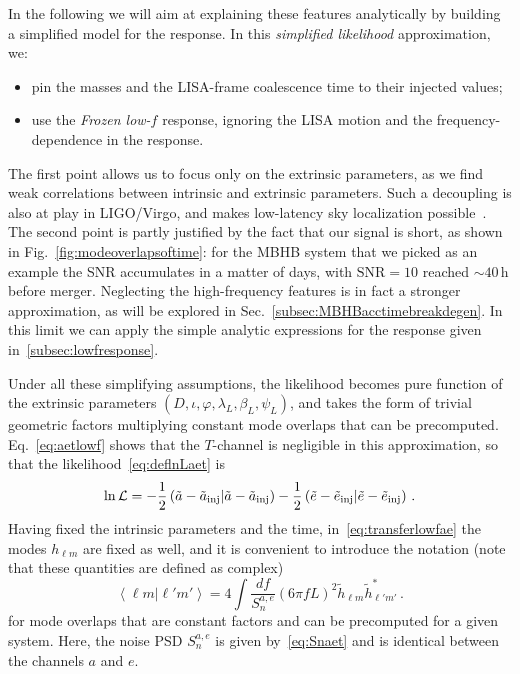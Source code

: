 \documentclass[aps,showpacs,twocolumn,prd,superscriptaddress,nofootinbib]{revtex4-1}
\newcommand{\be}{\begin{equation}}
\newcommand{\ee}{\end{equation}}
\newcommand\calL{{\mathcal{L}}}
\newcommand\betaL{{\beta_{L}}}
\newcommand\lambdaL{{\lambda_{L}}}
\newcommand\psiL{{\psi_{L}}}
\begin{document}
In the following we will aim at explaining these features analytically by building a simplified model for the response. In this \textit{simplified likelihood} approximation, we:
\begin{itemize}
	\item pin the masses and the LISA-frame coalescence time to their injected values;
	\item use the \textit{Frozen low-$f$} response, ignoring the LISA motion and the frequency-dependence in the response.
\end{itemize}
The first point allows us to focus only on the extrinsic parameters, as we find weak correlations between intrinsic and extrinsic parameters. Such a decoupling is also at play in LIGO/Virgo, and makes low-latency sky localization possible~\cite{SingerPrice15}. The second point is partly justified by the fact that our signal is short, as shown in Fig.~\ref{fig:modeoverlapsoftime}: for the MBHB system that we picked as an example the SNR accumulates in a matter of days, with $\mathrm{SNR}=10$ reached $\sim 40 \,\mathrm{h}$ before merger. Neglecting the high-frequency features is in fact a stronger approximation, as will be explored in Sec.~\ref{subsec:MBHBacctimebreakdegen}. In this limit we can apply the simple analytic expressions for the response given in~\ref{subsec:lowfresponse}.

Under all these simplifying assumptions, the likelihood becomes pure function of the extrinsic parameters $(D, \iota, \varphi, \lambdaL, \betaL, \psiL)$, and takes the form of trivial geometric factors multiplying constant mode overlaps that can be precomputed.  Eq.~\ref{eq:aetlowf} shows that the $T$-channel is negligible in this approximation, so that the likelihood~\eqref{eq:deflnLaet} is
\be
	\ln \calL = -\frac{1}{2} \left( \tilde{a} - \tilde{a}_{\rm inj} | \tilde{a} - \tilde{a}_{\rm inj} \right) -\frac{1}{2} \left( \tilde{e} - \tilde{e}_{\rm inj} | \tilde{e} - \tilde{e}_{\rm inj} \right) \,.
\ee
Having fixed the intrinsic parameters and the time, in~\eqref{eq:transferlowfae} the modes $h_{\ell m}$ are fixed as well, and it is convenient to introduce the notation (note that these quantities are defined as complex)
\be\label{eq:innerproductlmlpmp}
	\left\langle \ell m | \ell' m' \right\rangle = 4 \int \frac{df}{S_{n}^{a,e}} \left( 6 \pi f L\right)^{2} \tilde{h}_{\ell m} \tilde{h}_{\ell' m'}^{*} \,.
\ee
for mode overlaps that are constant factors and can be precomputed for a given system. Here, the noise PSD $S_{n}^{a,e}$ is given by~\eqref{eq:Snaet} and is identical between the channels $a$ and $e$.
\end{document}

